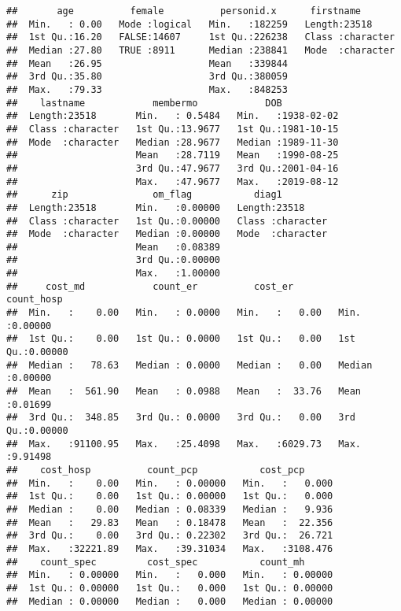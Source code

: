\documentclass[]{article}
\begin{document}
\begin{verbatim}
##       age          female          personid.x      firstname        
##  Min.   : 0.00   Mode :logical   Min.   :182259   Length:23518      
##  1st Qu.:16.20   FALSE:14607     1st Qu.:226238   Class :character  
##  Median :27.80   TRUE :8911      Median :238841   Mode  :character  
##  Mean   :26.95                   Mean   :339844                     
##  3rd Qu.:35.80                   3rd Qu.:380059                     
##  Max.   :79.33                   Max.   :848253                     
##    lastname            membermo            DOB            
##  Length:23518       Min.   : 0.5484   Min.   :1938-02-02  
##  Class :character   1st Qu.:13.9677   1st Qu.:1981-10-15  
##  Mode  :character   Median :28.9677   Median :1989-11-30  
##                     Mean   :28.7119   Mean   :1990-08-25  
##                     3rd Qu.:47.9677   3rd Qu.:2001-04-16  
##                     Max.   :47.9677   Max.   :2019-08-12  
##      zip               om_flag           diag1          
##  Length:23518       Min.   :0.00000   Length:23518      
##  Class :character   1st Qu.:0.00000   Class :character  
##  Mode  :character   Median :0.00000   Mode  :character  
##                     Mean   :0.08389                     
##                     3rd Qu.:0.00000                     
##                     Max.   :1.00000                     
##     cost_md            count_er          cost_er          count_hosp     
##  Min.   :    0.00   Min.   : 0.0000   Min.   :   0.00   Min.   :0.00000  
##  1st Qu.:    0.00   1st Qu.: 0.0000   1st Qu.:   0.00   1st Qu.:0.00000  
##  Median :   78.63   Median : 0.0000   Median :   0.00   Median :0.00000  
##  Mean   :  561.90   Mean   : 0.0988   Mean   :  33.76   Mean   :0.01699  
##  3rd Qu.:  348.85   3rd Qu.: 0.0000   3rd Qu.:   0.00   3rd Qu.:0.00000  
##  Max.   :91100.95   Max.   :25.4098   Max.   :6029.73   Max.   :9.91498  
##    cost_hosp          count_pcp           cost_pcp       
##  Min.   :    0.00   Min.   : 0.00000   Min.   :   0.000  
##  1st Qu.:    0.00   1st Qu.: 0.00000   1st Qu.:   0.000  
##  Median :    0.00   Median : 0.08339   Median :   9.936  
##  Mean   :   29.83   Mean   : 0.18478   Mean   :  22.356  
##  3rd Qu.:    0.00   3rd Qu.: 0.22302   3rd Qu.:  26.721  
##  Max.   :32221.89   Max.   :39.31034   Max.   :3108.476  
##    count_spec         cost_spec           count_mh       
##  Min.   : 0.00000   Min.   :   0.000   Min.   : 0.00000  
##  1st Qu.: 0.00000   1st Qu.:   0.000   1st Qu.: 0.00000  
##  Median : 0.00000   Median :   0.000   Median : 0.00000  

\end{verbatim}
\end{document}
